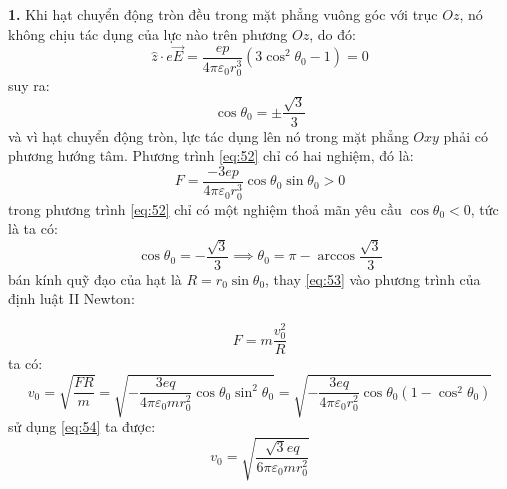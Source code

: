 \noindent\textbf{1.} Khi hạt chuyển động tròn đều trong mặt phẳng vuông góc với trục $Oz$, nó không chịu tác dụng của lực nào trên phương $Oz$, do đó:
\begin{equation}
  \label{eq:51}
  \hat{z}\cdot e\vec{E}=\frac{ep}{4\pi\varepsilon_{0}r_{0}^{3}}(3\cos^{2}\theta_{0}-1)=0
\end{equation}
suy ra:
\begin{equation}
  \label{eq:52}
  \cos\theta_{0}=\pm\frac{\sqrt{3}}{3}
\end{equation}
và vì hạt chuyển động tròn, lực tác dụng lên nó trong mặt phẳng $Oxy$ phải có phương hướng tâm. Phương trình \eqref{eq:52} chỉ có hai nghiệm, đó là:
\begin{equation}
  \label{eq:53}
  F=\frac{-3ep}{4\pi\varepsilon_{0}r_{0}^{3}}\cos\theta_{0}\sin\theta_{0}>0
\end{equation}
trong phương trình \eqref{eq:52} chỉ có một nghiệm thoả mãn yêu cầu $\cos\theta_{0}<0$, tức là ta có:
\begin{equation}
  \label{eq:54}
  \cos\theta_{0}=-\frac{\sqrt{3}}{3} \implies \theta_{0}=\pi-\arccos\frac{\sqrt{3}}{3}
\end{equation}
bán kính quỹ đạo của hạt là $R=r_{0}\sin\theta_{0}$, thay \eqref{eq:53} vào phương trình của định luật II Newton:

\begin{equation}
  \label{eq:55}
  F=m\frac{v_{0}^{2}}{R}
\end{equation}
ta có:
\begin{equation*}
  v_{0}=\sqrt{\frac{FR}{m}}=\sqrt{-\frac{3eq}{4\pi\varepsilon_{0}mr_{0}^{2}}\cos\theta_{0}\sin^{2}\theta_{0}}=\sqrt{-\frac{3eq}{4\pi\varepsilon_{0}r_{0}^{2}}\cos\theta_{0}(1-\cos^{2}\theta_{0})}
\end{equation*}
sử dụng \eqref{eq:54} ta được:
\begin{equation}
  \label{eq:56}
  v_{0}=\sqrt{\frac{\sqrt{3}eq}{6\pi\varepsilon_{0}mr_{0}^{2}}}
\end{equation}

